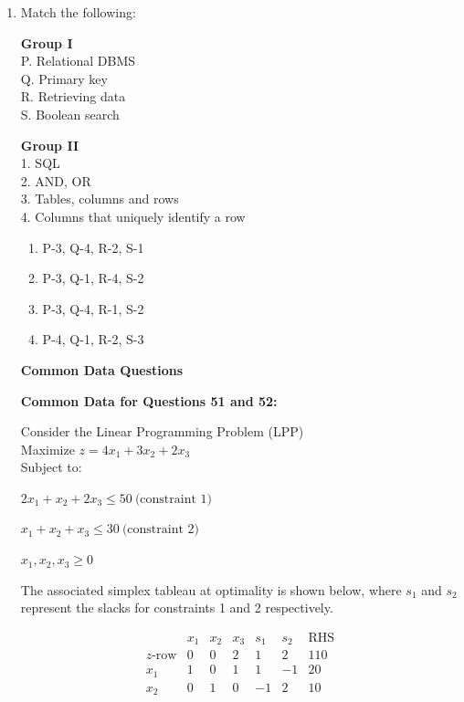 \documentclass[a4paper,12pt]{article}
\begin{document}
\begin{enumerate}[label=Q.\arabic*, leftmargin=*]
\item Match the following:

\vspace{0.5em}

\noindent
\begin{minipage}[t]{0.45\textwidth}
\textbf{Group I}\\[0.5em]
P. Relational DBMS \\
Q. Primary key \\
R. Retrieving data \\
S. Boolean search
\end{minipage}
\hfill
\begin{minipage}[t]{0.45\textwidth}
\textbf{Group II}\\[0.5em]
1. SQL \\
2. AND, OR \\
3. Tables, columns and rows \\
4. Columns that uniquely identify a row
\end{minipage}

\vspace{1em}

\begin{multicols}{2}
\begin{enumerate}[label=(\Alph*)]
    \item P-3, Q-4, R-2, S-1
    \item P-3, Q-1, R-4, S-2
    \item P-3, Q-4, R-1, S-2
    \item P-4, Q-1, R-2, S-3 
\end{enumerate}
\end{multicols}

\newpage
\textbf{\large{Common Data Questions}}

\textbf{Common Data for Questions 51 and 52:}

Consider the Linear Programming Problem (LPP)\\
Maximize  $ z = 4x_1 + 3x_2 + 2x_3 $ \\
Subject to:

\centerline{ $2x_1 + x_2 + 2x_3 \leq 50\  \text{(constraint 1)}\ $ } 
\centerline {$ x_1 + x_2 + x_3 \leq 30\  \text{(constraint 2)} $}
\centerline{$x_1, x_2, x_3 \geq 0 $}

The associated simplex tableau at optimality is shown below, where \(s_1\) and \(s_2\) represent the slacks for constraints 1 and 2 respectively.

$$\begin{array}{c|ccccc|c}
\text{} & x_1 & x_2 & x_3 & s_1 & s_2 & \text{RHS} \\ \hline
z\text{-row} & 0 & 0 & 2 & 1 & 2 & 110 \\ \hline
x_1 & 1 & 0 & 1 & 1 & -1 & 20 \\
x_2 & 0 & 1 & 0 & -1 & 2 & 10 \\
\end{array}
$$
\end{enumerate}
\end{document}
